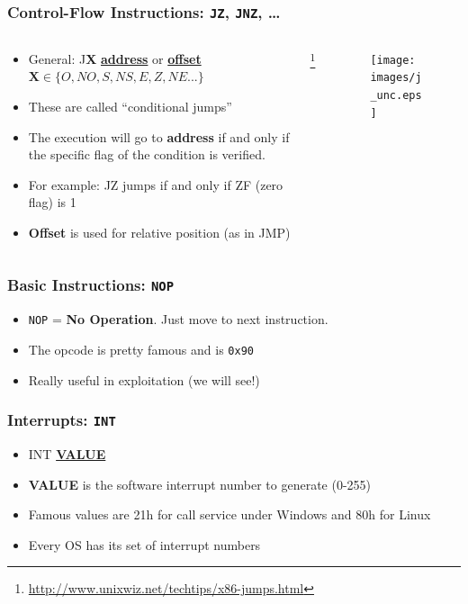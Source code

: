 \documentclass[]{beamer}
\begin{document}
\begin{frame}
  \frametitle{Control-Flow Instructions: {\tt JZ}, {\tt JNZ}, \dots}
  \begin{columns}
    \begin{column}{2.5in}
      \begin{itemize}
      \item{General: J\textbf{X} \underline{\textbf{address}} or \underline{\textbf{offset}}}\\
        $ \mathbf{X} \in \{O,NO,S,NS,E,Z,NE...\}$\\
      \item{These are called ``conditional jumps''}
      \item {The execution will go to \textbf{address} if and only if
          the specific flag of the condition is verified.}
      \item {For example: JZ jumps if and only if ZF (zero flag) is 1}
      \item{\textbf{Offset} is used for relative position (as in JMP)}
      \end{itemize}
    \end{column}\footnote{\url{http://www.unixwiz.net/techtips/x86-jumps.html}}
    \begin{column}{2.5in}
      \begin{figure}
        \texttt{[image: images/j\_unc.eps]}									      \label{control}
        \label{Control Flow JZ}
      \end{figure}
    \end{column}

  \end{columns}
\end{frame}

\begin{frame}
  \frametitle{Basic Instructions: {\tt NOP}}
  \begin{itemize}
  \item{{\tt NOP} = \textbf{No Operation}. Just move to next instruction.}
  \item{The opcode is pretty famous and is {\tt 0x90}}
  \item{Really useful in exploitation (we will see!)}
  \end{itemize}
\end{frame}


\begin{frame}
  \frametitle{Interrupts: {\tt INT}}
  \begin{itemize}
  \item{INT \underline{\textbf{VALUE}}}\\
  \item{\textbf{VALUE} is the software interrupt number to generate (0-255)}
  \item{Famous values are 21h for call service under Windows and 80h for Linux}
  \item{Every OS has its set of interrupt numbers}
  \end{itemize}
\end{frame}
\end{document}
